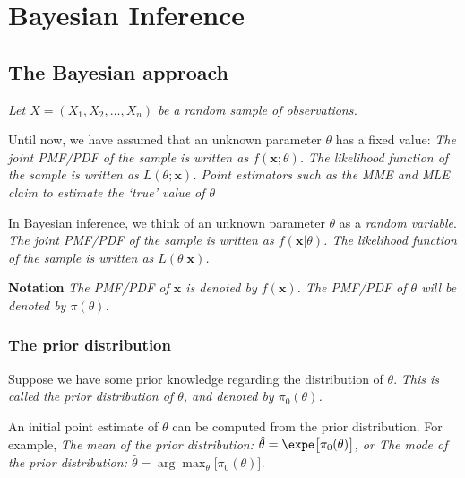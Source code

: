 \chapter{Bayesian Inference}\label{chap:bayesian}
\setcounter{page}{1}
\startcontents[chapters]
\chapcontents

\section{The Bayesian approach}
\bit
\it Let $X=(X_1,X_2,\ldots,X_n)$ be a random sample of observations.
\eit

\vspace*{2ex}
Until now, we have assumed that an unknown parameter $\theta$ has a fixed value:
\bit
\it The joint PMF/PDF of the sample is written as $f(\mathbf{x};\theta)$.
\it The likelihood function of the sample is written as $L(\theta;\mathbf{x})$.
\it Point estimators such as the MME and MLE claim to estimate the `true' value of $\theta$
\eit

\vspace*{2ex}
In Bayesian inference, we think of an unknown parameter $\theta$ as a \emph{random variable}.
\bit
\it The joint PMF/PDF of the sample is written as $f(\mathbf{x}|\theta)$.
\it The likelihood function of the sample is written as $L(\theta|\mathbf{x})$.
\eit

\vspace*{2ex}
\textbf{Notation}
\bit
\it The PMF/PDF of $\mathbf{x}$ is denoted by $f(\mathbf{x})$.
\it The PMF/PDF of $\theta$ will be denoted by $\pi(\theta)$.
\eit

\subsection{The prior distribution}
Suppose we have some prior knowledge regarding the distribution of $\theta$. 
\bit
\it This is called the \emph{prior distribution} of $\theta$, and denoted by $\pi_0(\theta)$.
\eit

\vspace*{2ex}
An initial point estimate of $\theta$ can be computed from the prior distribution. For example,
\bit
\it The mean of the prior distribution: $\hat{\theta} = \expe\big[\pi_0(\theta)\big]$, or
\it The mode of the prior distribution: $\hat{\theta} = \arg\max_{\theta}\big[\pi_0(\theta)\big]$.
\eit

